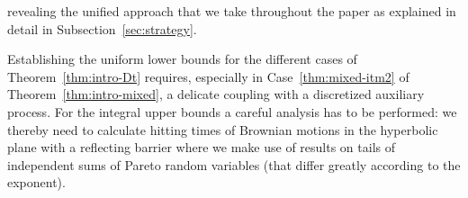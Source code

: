revealing the unified approach that we take throughout the paper as explained in detail in Subsection~\ref{sec:strategy}. 

Establishing the uniform lower bounds for the different cases of Theorem~\ref{thm:intro-Dt} requires, especially in Case~\eqref{thm:mixed-itm2} of Theorem~\ref{thm:intro-mixed}, a delicate coupling with a discretized auxiliary process. For the integral upper bounds a careful analysis has to be performed: we thereby need to calculate hitting times of Brownian motions in the hyperbolic plane with a reflecting barrier where we make use of results on tails of independent sums of Pareto random variables (that differ greatly according to the exponent).

